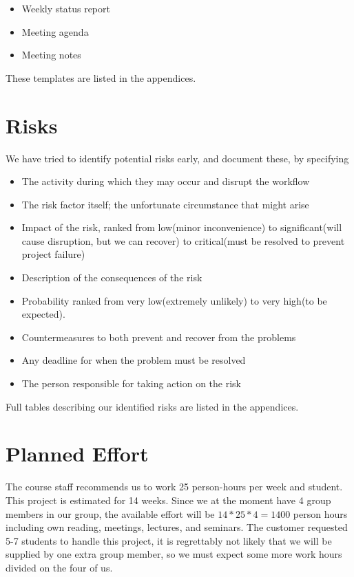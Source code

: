 \begin{itemize}
\item Weekly status report
\item Meeting agenda
\item Meeting notes
\end{itemize}

These templates are listed in the appendices.

\section{Risks}
We have tried to identify potential risks early, and document these, by specifying
\begin{itemize}
\item The activity during which they may occur and disrupt the workflow
\item The risk factor itself; the unfortunate circumstance that might arise
\item Impact of the risk, ranked from low(minor inconvenience) to significant(will cause disruption, but we can recover) to critical(must be resolved to prevent project failure)
\item Description of the consequences of the risk
\item Probability ranked from very low(extremely unlikely) to very high(to be expected).
\item Countermeasures to both prevent and recover from the problems
\item Any deadline for when the problem must be resolved
\item The person responsible for taking action on the risk
\end{itemize}

Full tables describing our identified risks are listed in the appendices.


\section{Planned Effort}
The course staff recommends us to work 25 person-hours per week and student. This project is estimated for 14 weeks. Since we at the moment have 4 group members in our group, the available effort will be $14*25*4=1400$ person hours including own reading, meetings, lectures, and seminars. The customer requested 5-7 students to handle this project, it is regrettably not likely that we will be supplied by one extra group member, so we must expect some more work hours divided on the four of us.

